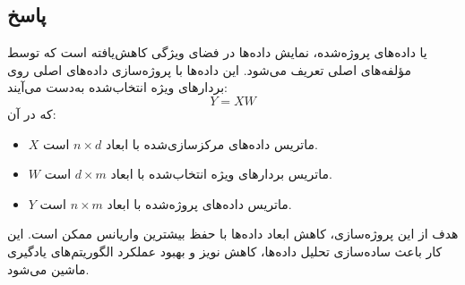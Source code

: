 \documentclass[12pt]{article}
\begin{document}
	\subsection*{پاسخ}
	 یا داده‌های پروژه‌شده، نمایش داده‌ها در فضای ویژگی کاهش‌یافته است که توسط مؤلفه‌های اصلی تعریف می‌شود. این داده‌ها با پروژه‌سازی داده‌های اصلی روی بردارهای ویژه انتخاب‌شده به‌دست می‌آیند:
	\[
	Y = X W
	\]
	که در آن:
	\begin{itemize}
		\item $X$ ماتریس داده‌های مرکزسازی‌شده با ابعاد $n \times d$ است.
		\item $W$ ماتریس بردارهای ویژه انتخاب‌شده با ابعاد $d \times m$ است.
		\item $Y$ ماتریس داده‌های پروژه‌شده با ابعاد $n \times m$ است.
	\end{itemize}
	
	هدف از این پروژه‌سازی، کاهش ابعاد داده‌ها با حفظ بیشترین واریانس ممکن است. این کار باعث ساده‌سازی تحلیل داده‌ها، کاهش نویز و بهبود عملکرد الگوریتم‌های یادگیری ماشین می‌شود.
	
\end{document}
